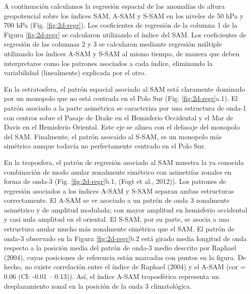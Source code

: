 \documentclass[12pt,oneside]{reedthesis}
\begin{document}
A continuación calculamos la regresión espacial de las anomalías de altura geopotencial sobre los índices SAM, A-SAM y S-SAM en los niveles de 50 hPa y 700 hPa (Fig. \ref{fig:2d-regr}).
Los coeficientes de regresión de la columna 1 de la Figura \ref{fig:2d-regr} se calcularon utilizando el índice del SAM.
Los coeficientes de regresión de las columnas 2 y 3 se calcularon mediante regresión múltiple utilizando los índices A-SAM y S-SAM al mismo tiempo, de manera que deben interpretarse como los patrones asociados a cada índice, eliminando la variabilidad (linealmente) explicada por el otro.

En la estratosfera, el patrón espacial asociado al SAM está claramente dominado por un monopolo que no está centrada en el Polo Sur (Fig. \ref{fig:2d-regr}a.1).
El patrón asociado a la parte asimétrica se caracteriza por una estructura de onda-1 con centros sobre el Pasaje de Drake en el Hemisferio Occidental y el Mar de Davis en el Hemisferio Oriental.
Este eje se alinea con el defasaje del monopolo del SAM.
Finalmente, el patrón asocaido al S-SAM, es un monopolo más simétrico aunque todavía no perfectamente centrado en el Polo Sur.

En la troposfera, el patrón de regresión asociado al SAM muestra la ya conocida combinación de modo anular zonalmente simétrico con asimetrías zonales en forma de onda-3 (Fig. \ref{fig:2d-regr}b.1, (Fogt et al., 2012)).
Los patrones de regresión asociados a los índices A-SAM y S-SAM separan ambas estructuras correctamente.
El A-SAM se ve asociado a un patrón de onda 3 zonalmente asimétrico y de amplitud modulada; con mayor amplitud en hemisferio occidental y casi nula amplitud en el oriental.
El S-SAM, por su parte, se asocia a una estructura anular mucho más zonalmente simétrica que el SAM.
El patrón de onda-3 observado en la Figura \ref{fig:2d-regr}b.2 está girado media longitud de onda respecto a la posición media del patrón de onda-3 medio descrito por Raphael (2004), cuyas posiciones de referencia están marcadas con puntos en la figura.
De hecho, no existe correlación entre el índice de Raphael (2004) y el A-SAM (cor = 0.06 (CI: -0.01 -- 0.13)).
Así, el índice A-SAM troposférico representa un desplazamiento zonal en la posición de la onda 3 climatológica.
\end{document}
